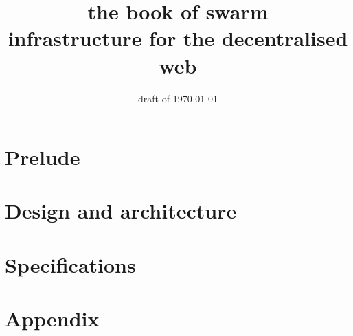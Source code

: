 \documentclass[a4paper,12pt,fullpage,openany,hyperfootnotes,hidelinks]{scrbook}
\title{\Huge\sc the book of swarm\\
\Large infrastructure for the decentralised web}
\author{}
\date{draft of \today}
\theoremstyle{definition}
\begin{document}
\maketitle
\setcounter{tocdepth}{2}
\tableofcontents
\part{Prelude}


\part{Design and architecture}

\part{Specifications}


\cite{ethersphere2016smash}
\cite{ethersphere2016sw3}
\cite{maymounkov2002kademlia}
\cite{heep2010r}
  

\appendix
\part{Appendix}

\printglossary
\end{document}
